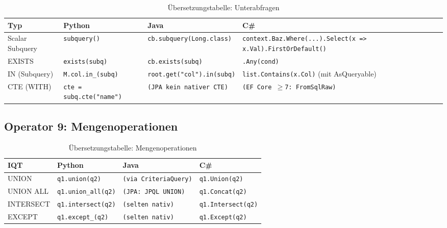 \begin{table}
\centering
\caption{Übersetzungstabelle: Unterabfragen}
\label{tab:subquery_ops}
\renewcommand{\arraystretch}{1.4}
\begin{tabularx}{\textwidth}{lXXX}
\toprule
\textbf{Typ} & \textbf{Python} & \textbf{Java} & \textbf{C\#} \\
\midrule
Scalar Subquery
  & \texttt{subquery()}
  & \texttt{cb.subquery(Long.class)}
  & \texttt{context.Baz.Where(...).Select(x => x.Val).FirstOrDefault()} \\
EXISTS
  & \texttt{exists(subq)}
  & \texttt{cb.exists(subq)}
  & \texttt{.Any(cond)} \\
IN (Subquery)
  & \texttt{M.col.in\_(subq)}
  & \texttt{root.get("col").in(subq)}
  & \texttt{list.Contains(x.Col)} (mit AsQueryable) \\
CTE (WITH)
  & \texttt{cte = subq.cte("name")}
  & \texttt{(JPA kein nativer CTE)}
  & \texttt{(EF Core $\geq$7: FromSqlRaw)} \\
\bottomrule
\end{tabularx}
\end{table}

\subsection{Operator 9: Mengenoperationen}
\label{subsec:op_set}

\begin{table}[H]
\centering
\caption{Übersetzungstabelle: Mengenoperationen}
\label{tab:set_ops}
\renewcommand{\arraystretch}{1.4}
\begin{tabularx}{\textwidth}{lXXX}
\toprule
\textbf{IQT} & \textbf{Python} & \textbf{Java} & \textbf{C\#} \\
\midrule
UNION
  & \texttt{q1.union(q2)}
  & \texttt{(via CriteriaQuery)} 
  & \texttt{q1.Union(q2)} \\
UNION ALL
  & \texttt{q1.union\_all(q2)}
  & \texttt{(JPA: JPQL UNION)} 
  & \texttt{q1.Concat(q2)} \\
INTERSECT
  & \texttt{q1.intersect(q2)}
  & \texttt{(selten nativ)}
  & \texttt{q1.Intersect(q2)} \\
EXCEPT
  & \texttt{q1.except\_(q2)}
  & \texttt{(selten nativ)}
  & \texttt{q1.Except(q2)} \\
\bottomrule
\end{tabularx}
\end{table}

